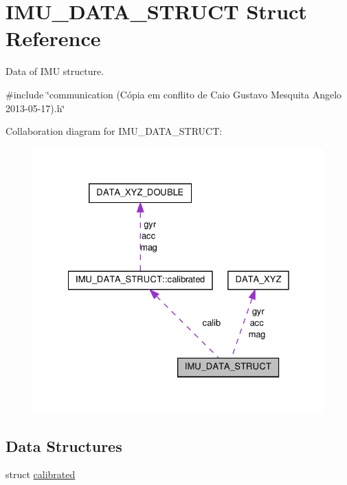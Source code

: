 \hypertarget{structIMU__DATA__STRUCT}{\section{I\-M\-U\-\_\-\-D\-A\-T\-A\-\_\-\-S\-T\-R\-U\-C\-T Struct Reference}
\label{structIMU__DATA__STRUCT}
}


Data of I\-M\-U structure.  




{\ttfamily \#include \char`\"{}communication (\-Cópia em conflito de Caio Gustavo Mesquita Angelo 2013-\/05-\/17).\-h\char`\"{}}



Collaboration diagram for I\-M\-U\-\_\-\-D\-A\-T\-A\-\_\-\-S\-T\-R\-U\-C\-T\-:\nopagebreak
\begin{figure}[H]
\begin{center}
\leavevmode
\includegraphics[width=328pt]{structIMU__DATA__STRUCT__coll__graph}
\end{center}
\end{figure}
\subsection*{Data Structures}
\begin{DoxyCompactItemize}
\item 
struct \hyperlink{structIMU__DATA__STRUCT_1_1calibrated}{calibrated}
\end{DoxyCompactItemize}
